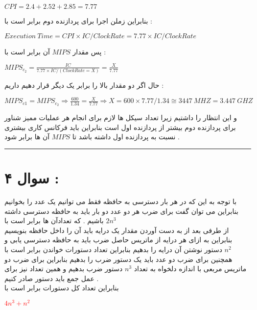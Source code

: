 \documentclass{article}
\begin{document}
\begin{center}
	$ CPI = 2.4 + 2.52 + 2.85 = 7.77$
\end{center}
بنابراین زملن اجرا برای پردازنده دوم برابر است با   : 
\begin{center}
	$ Execution \ Time  = CPI \times IC /  Clock Rate =7.77  \times IC  / Clock Rate $
\end{center}
پس مقدار $MIPS$  آن برابر است با  : 
\begin{center}
	$MIPS_{c_2} = \frac{IC}{7.77  \times IC  / (Clock Rate = X)} = \frac{X}{7.77} $
\end{center}
حال اگر دو مقدار بالا را برابر یک دیگر قرار دهیم داریم : 
\begin{center}
	$ MIPS_{c1} = MIPS_{c_2} \Rightarrow \frac{600}{1.34} = \frac{X}{7.77} \Rightarrow X = 600 \times 7.77 / 1.34 \cong 3447  \ MHZ = 3.447 \ GHZ$
\end{center}
و این انتظار را داشتیم زیرا تعداد سیکل ها لازم برای انجام هر عملیات ممیز شناور برای پردازنده دوم بیشتر از پردازنده اول است بنابراین باید فرکانس کاری بیشتری نسبت به پردازنده اول داشته باشد تا $MIPS$ آن ها برابر شود . 
\hrule
\newpage
\section*{سوال ۴ : }
با توجه به این که در هر بار دسترسی به حافظه فقط می توانیم یک عدد را بخوانیم بنابراین می توان گفت برای ضرب هر دو عدد دو بار باید به حافظه دسترسی داشته باشیم  . که تعدادآن ها برابر است با 
$2n^3$
\\
از طرفی بعد از به دست آوردن مقدار یک درایه باید آن را داخل حافظه بنویسیم بنابراین به ازای هر درایه از ماتریس حاصل ضرب باید به حافظه دسترسی یابی و دستور نوشتن آن درایه را بدهیم بنابراین تعداد دستورات خواندن برابر است با 
$n^2$
\\
همچنین برای ضرب دو عدد باید یک دستور ضرب را بدهیم بنابراین برای ضرب دو ماتریس مربعی با اندازه دلخواه به تعداد 
$n^3$
دستور ضرب بدهیم و همین تعداد نیز برای عمل جمع باید دستور صادر کنیم  . 
\\
بنابراین تعداد کل دستورات برابر است با 
\begin{center}
\textcolor{red}{$4n^3+n^2$}
\end{center}
\end{document}
